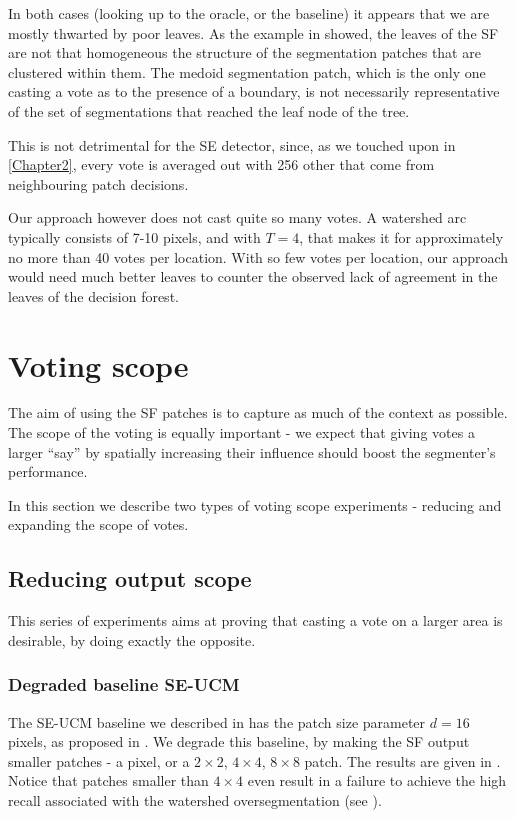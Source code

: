 In both cases (looking up to the oracle, or the baseline) it appears that we are mostly thwarted by poor leaves. As the example in  showed, the leaves of the SF are not that homogeneous \wrt the structure of the segmentation patches that are clustered within them. 
The medoid segmentation patch, which is the only one casting a vote as to the presence of a boundary, is not necessarily representative of the set of segmentations that reached the leaf node of the tree.

This is not detrimental for the SE detector, since, as we touched upon in \cref{Chapter2}, every vote is averaged out with 256 other that come from neighbouring patch decisions. 

Our approach however does not cast quite so many votes. A watershed arc typically consists of 7-10 pixels, and with $T=4$, that makes it for approximately no more than 40 votes per location. 
With so few votes per location, our approach would need much better leaves to counter the observed lack of %
agreement in the leaves of the decision forest.


\section{Voting scope}
The aim of using the SF patches is to capture as much of the context as possible. The scope of the voting is equally important - we expect that giving votes a larger ``say'' by spatially increasing their influence should boost the segmenter's performance.

In this section we describe two types of voting scope experiments - reducing and expanding the scope of votes.

\subsection{Reducing output scope}
This series of experiments aims at proving that casting a vote on a larger area is desirable, by doing exactly the opposite.

\subsubsection{Degraded baseline SE-UCM}
The SE-UCM baseline we described in  has the patch size parameter $d=16$ pixels, as proposed in \cite{DollarICCV13edges}. We degrade this baseline, by making the SF output smaller patches - a pixel, or a $2\times2$, $4\times4$, $8\times8$ patch. The results are given in . Notice that patches smaller than $4\times 4$ even result in a failure to achieve the high recall associated with the watershed oversegmentation (see ).

